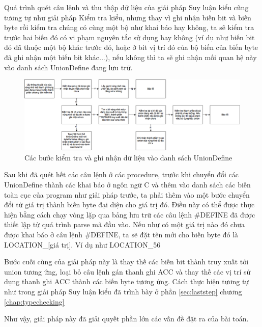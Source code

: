 Quá trình quét câu lệnh và thu thập dữ liệu của giải pháp Suy luận kiểu cũng tương tự như giải pháp Kiểm tra kiểu, nhưng thay vì ghi nhận biến bit và biến byte rồi kiểm tra chúng có cùng một bộ như khai báo hay không, ta sẽ kiểm tra trước hai biến đó có vi phạm nguyên tắc sử dụng hay không (ví dụ như biến bit đó đã thuộc một bộ khác trước đó, hoặc ở bit vị trí đó của bộ biến của biến byte đã ghi nhận một biến bit khác...), nếu không thì ta sẽ ghi nhận mối quan hệ này vào danh sách UnionDefine đang lưu trữ.

\begin{figure}[h]
\centering
\includegraphics[width=0.7\linewidth]{image/stepUnionMaking}
\caption{Các bước kiểm tra và ghi nhận dữ liệu vào danh sách UnionDefine}
\label{fig:stepunionmaking}
\end{figure}


Sau khi đã quét hết các câu lệnh ở các procedure, trước khi chuyển đổi các UnionDefine thành các khai báo ở ngôn ngữ C và thêm vào danh sách các biến toàn cục của program như giải pháp trước, ta phải thêm vào một bước chuyển đổi từ giá trị thành biến byte đại diện cho giá trị đó. Điều này có thể được thực hiện bằng cách chạy vòng lặp qua bảng lưu trữ các câu lệnh \#DEFINE đã được thiết lập từ quá trình parse mã đầu vào. Nếu như có một giá trị nào đó chưa được khai báo ở câu lệnh \#DEFINE, ta sẽ đặt tên mới cho biến byte đó là LOCATION\_[giá trị]. Ví dụ như LOCATION\_56

Bước cuối cùng của giải pháp này là thay thế các biến bit thành truy xuất tới union tương ứng, loại bỏ câu lệnh gán thanh ghi ACC và thay thế các vị trí sử dụng thanh ghi ACC thành các biến byte tương ứng. Cách thực hiện tương tự như trong giải pháp Suy luận kiểu đã trình bày ở phần \ref{sec:laststep} chương \ref{chap:typechecking}

Như vậy, giải pháp này đã giải quyết phần lớn các vấn đề đặt ra của bài toán. 
